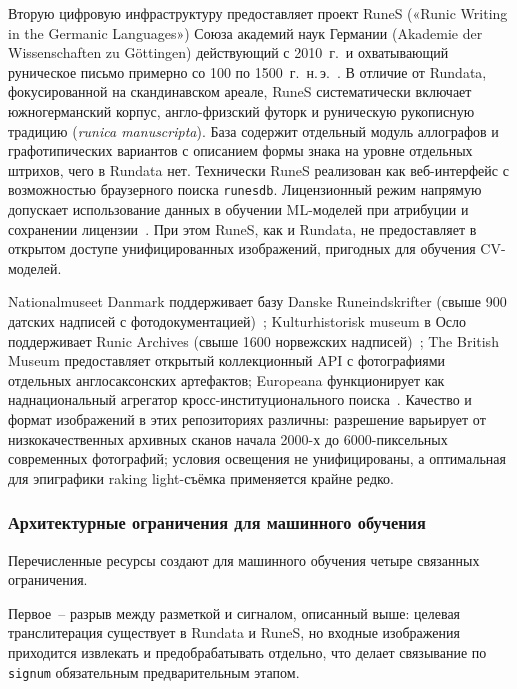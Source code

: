 \documentclass[a4paper,12pt]{extarticle}
\begin{document}
Вторую цифровую инфраструктуру предоставляет проект RuneS («Runic Writing in the Germanic Languages») Союза академий наук Германии (Akademie der Wissenschaften zu Göttingen) действующий с 2010~г.\ и охватывающий руническое письмо примерно со 100 по 1500~г.\ н.\,э.~\cite{duwelmarold2011,runesdb}. В отличие от Rundata, фокусированной на скандинавском ареале, RuneS систематически включает южногерманский корпус, англо-фризский футорк и руническую рукописную традицию (\textit{runica manuscripta}). База содержит отдельный модуль аллографов и графотипических вариантов с описанием формы знака на уровне отдельных штрихов, чего в Rundata нет. Технически RuneS реализован как веб-интерфейс с возможностью браузерного поиска \texttt{runesdb}. Лицензионный режим напрямую допускает использование данных в обучении ML-моделей при атрибуции и сохранении лицензии~\cite{runesdb}. При этом RuneS, как и Rundata, не предоставляет в открытом доступе унифицированных изображений, пригодных для обучения CV-моделей.

Nationalmuseet Danmark поддерживает базу Danske Runeindskrifter (свыше 900 датских надписей с фотодокументацией)~\cite{nationalmuseet2024}; Kulturhistorisk museum в Осло поддерживает Runic Archives (свыше 1600 норвежских надписей)~\cite{khmoslo2024}; The British Museum предоставляет открытый коллекционный API с фотографиями отдельных англосаксонских артефактов; Europeana функционирует как наднациональный агрегатор кросс-институционального поиска~\cite{europeana2024}. Качество и формат изображений в этих репозиториях различны: разрешение варьирует от низкокачественных архивных сканов начала 2000-х до 6000-пиксельных современных фотографий; условия освещения не унифицированы, а оптимальная для эпиграфики raking light-съёмка применяется крайне редко.

\subsubsection{Архитектурные ограничения для машинного обучения}
\label{sec:ml-architecture-limits}

Перечисленные ресурсы создают для машинного обучения четыре связанных ограничения.

Первое~-- разрыв между разметкой и сигналом, описанный выше: целевая транслитерация существует в Rundata и RuneS, но входные изображения приходится извлекать и предобрабатывать отдельно, что делает связывание по \texttt{signum} обязательным предварительным этапом.
\end{document}
